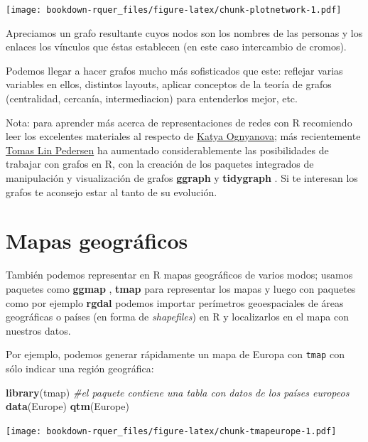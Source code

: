 \documentclass[]{book}
\newenvironment{Shaded}{\begin{snugshade}}{\end{snugshade}}
\newcommand{\CommentTok}[1]{\textcolor[rgb]{0.56,0.35,0.01}{\textit{#1}}}
\newcommand{\KeywordTok}[1]{\textcolor[rgb]{0.13,0.29,0.53}{\textbf{#1}}}
\newcommand{\NormalTok}[1]{#1}
\theoremstyle{definition}
\theoremstyle{definition}
\theoremstyle{definition}
\theoremstyle{remark}
\begin{document}
\texttt{[image: bookdown-rquer\_files/figure-latex/chunk-plotnetwork-1.pdf]}

Apreciamos un grafo resultante cuyos nodos son los nombres de las
personas y los enlaces los vínculos que éstas establecen (en este caso
intercambio de cromos).

Podemos llegar a hacer grafos mucho más sofisticados que este: reflejar
varias variables en ellos, distintos layouts, aplicar conceptos de la
teoría de grafos (centralidad, cercanía, intermediacion) para
entenderlos mejor, etc.

Nota: para aprender más acerca de representaciones de redes con R
recomiendo leer los excelentes materiales al respecto de
\href{https://kateto.net/}{Katya Ognyanova}; más recientemente
\href{https://www.data-imaginist.com/}{Tomas Lin Pedersen} ha aumentado
considerablemente las posibilidades de trabajar con grafos en R, con la
creación de los paquetes integrados de manipulación y visualización de
grafos \textbf{ggraph} \citep{R-ggraph} y \textbf{tidygraph}
\citep{R-tidygraph}. Si te interesan los grafos te aconsejo estar al
tanto de su evolución.

\hypertarget{mapas-geograficos}{%
\section{Mapas geográficos}\label{mapas-geograficos}}

También podemos representar en R mapas geográficos de varios modos;
usamos paquetes como \textbf{ggmap} \citep{R-ggmap}, \textbf{tmap}
\citep{R-tmap} para representar los mapas y luego con paquetes como por
ejemplo \textbf{rgdal} \citep{R-rgdal} podemos importar perímetros
geoespaciales de áreas geográficas o países (en forma de
\emph{shapefiles}) en R y localizarlos en el mapa con nuestros datos.

Por ejemplo, podemos generar rápidamente un mapa de Europa con
\texttt{tmap} con sólo indicar una región geográfica:

\begin{Shaded}
\begin{Highlighting}[]
\KeywordTok{library}\NormalTok{(tmap)}
\CommentTok{#el paquete contiene una tabla con datos de los países europeos }
\KeywordTok{data}\NormalTok{(Europe)}
\KeywordTok{qtm}\NormalTok{(Europe)}
\end{Highlighting}
\end{Shaded}

\texttt{[image: bookdown-rquer\_files/figure-latex/chunk-tmapeurope-1.pdf]}
\end{document}

